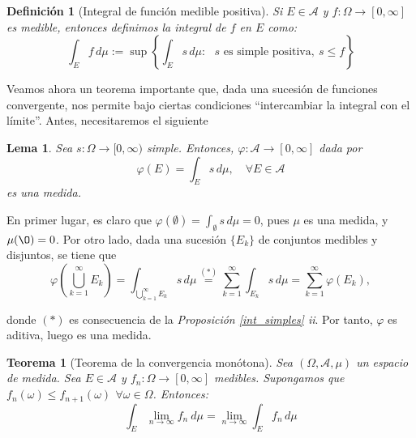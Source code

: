 \documentclass[11pt, a4paper]{article}
\makeatletter
\newif\IfInSansMode
\let\oldsf\sffamily
\renewcommand*{\sffamily}{\oldsf\mathversion{sans}\InSansModetrue}
\let\oldnorm\normalfont
\renewcommand*{\normalfont}{\oldnorm\InSansModefalse\mathversion{normal}}
\newcommand{\W}{\Omega}
\renewenvironment{proof}[1][\proofname] {\par\pushQED{\qed}\normalfont\topsep6\p@\@plus6\p@\relax\trivlist\item[\hskip\labelsep\itshape\sffamily#1\@addpunct{.}]\ignorespaces}{\popQED\endtrivlist\@endpefalse}
\theoremstyle{theorem-style}
\newtheorem{nth}{Teorema}[section]
\newtheorem{lema}{Lema}[section]
\theoremstyle{definition-style}
\newtheorem{ndef}{Definición}[section]
\theoremstyle{remark-style}
\theoremstyle{example-style}
\makeatother
\begin{document}
\begin{ndef}[Integral de función medible positiva]
  Si $E\in \mathscr A$ y $f: \Omega \to [0,\infty]$ es medible, entonces definimos la integral de $f$ en $E$ como:
  \[
    \int_E f\, d\mu := \sup\left\{\int_E s\, d\mu: \text{ $s$ es simple positiva}, \ s \leq f\right\}
  \]
  
\end{ndef}

Veamos ahora un teorema importante que, dada una sucesión de funciones convergente, nos permite bajo ciertas condiciones ``intercambiar la integral con el límite''. Antes, necesitaremos el siguiente


\begin{lema} \label{phi}
	Sea $s:\W \to [0,\infty)$ simple. Entonces, $\varphi:\mathscr A \to [0,\infty]$ dada por $$\varphi(E) = \int_E s\, d\mu, \quad \forall E \in \mathscr A$$ es una medida.
\end{lema}

	\begin{proof} En primer lugar, es claro que $\displaystyle \varphi(\emptyset) = \int_\emptyset s\, d\mu = 0$, pues $\mu$ es una medida, y $\mu(\O) = 0$. Por otro lado, dada una sucesión $\{E_k\}$ de conjuntos medibles y disjuntos, se tiene que $$\varphi \left(\bigcup_{k=1}^\infty E_k \right) = \int_{\bigcup_{k=1}^\infty E_k} s\, d\mu \overset{(*)}{=} \sum_{k=1}^\infty \int_{E_k} s\, d\mu = \sum_{k=1}^\infty \varphi(E_k),$$ 
	
	donde $(*)$ es consecuencia de la \textit{Proposición \ref{int_simples} ii}. Por tanto, $\varphi$ es aditiva, luego es una medida.
\end{proof}

\begin{nth}[Teorema de la convergencia monótona] \label{tcm}
  Sea $(\Omega,\mathscr A,\mu)$ un espacio de medida. Sea $E\in \mathscr A$ y $f_n: \Omega \to [0,\infty]$ medibles. Supongamos que $f_n(\omega) \leq f_{n+1}(\omega) \, \ \forall \omega \in \Omega$. Entonces:
  \[
    \int_E \lim_{n \to \infty} f_n\ d\mu = \lim_{n \to \infty}\int_E f_n\, d \mu
  \]
\end{nth}
\end{document}
